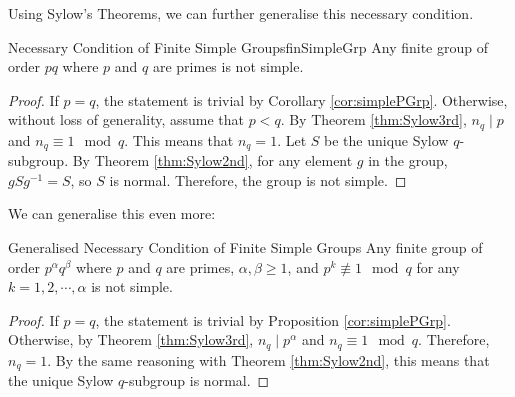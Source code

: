 \documentclass[math]{amznotes}
\theoremstyle{remark}
\newcommand{\0}{\mathbf{0}}
\newcommand{\1}{\mathbf{1}}
\begin{document}
Using Sylow's Theorems, we can further generalise this necessary condition.
\begin{probox}{Necessary Condition of Finite Simple Groups}{finSimpleGrp}
    Any finite group of order $pq$ where $p$ and $q$ are primes is not simple.
    \tcblower
    \begin{proof}
        If $p = q$, the statement is trivial by Corollary \ref{cor:simplePGrp}. Otherwise, without loss of generality, assume that $p < q$. By Theorem \ref{thm:Sylow3rd}, $n_q \mid p$ and $n_q \equiv 1 \mod q$. This means that $n_q = 1$. Let $S$ be the unique Sylow $q$-subgroup. By Theorem \ref{thm:Sylow2nd}, for any element $g$ in the group, $gSg^{-1} = S$, so $S$ is normal. Therefore, the group is not simple.
    \end{proof}
\end{probox}
We can generalise this even more:
\begin{probox}{Generalised Necessary Condition of Finite Simple Groups}
    Any finite group of order $p^{\alpha}q^{\beta}$ where $p$ and $q$ are primes, $\alpha, \beta \geq 1$, and $p^k \not\equiv 1 \mod q$ for any $k = 1, 2, \cdots, \alpha$ is not simple.
    \tcblower
    \begin{proof}
        If $p = q$, the statement is trivial by Proposition \ref{cor:simplePGrp}. Otherwise, by Theorem \ref{thm:Sylow3rd}, $n_q \mid p^{\alpha}$ and $n_q \equiv 1 \mod q$. Therefore, $n_q = 1$. By the same reasoning with Theorem \ref{thm:Sylow2nd}, this means that the unique Sylow $q$-subgroup is normal.
    \end{proof}
\end{probox}
\end{document}

